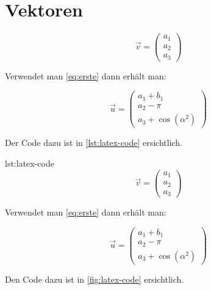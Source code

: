 \section{Vektoren}

\begin{equation}\label{eq:erste}
\vec v = \begin{pmatrix}
a_1\\
a_2\\
a_3
\end{pmatrix}
\end{equation}

Verwendet man \autoref{eq:erste} dann erhält man:

\begin{equation}\label{eq:zweite}
\vec u = \begin{pmatrix}
a_1+b_1\\
a_2-\pi\\
a_3+\cos\left(\alpha^2\right)
\end{pmatrix}
\end{equation}

Der Code dazu ist in \autoref{lst:latex-code} ersichtlich.

\begin{latexcode}{lst:latex-code}
\begin{equation}\label{eq:erste}
\vec v = \begin{pmatrix}
a_1\\
a_2\\
a_3
\end{pmatrix}
\end{equation}

Verwendet man \autoref{eq:erste} dann erhält man:

\begin{equation}\label{eq:zweite}
\vec u = \begin{pmatrix}
a_1+b_1\\
a_2-\pi\\
a_3+\cos\left(\alpha^2\right)
\end{pmatrix}
\end{equation}

Den Code dazu ist in \autoref{fig:latex-code} ersichtlich.
\end{latexcode}